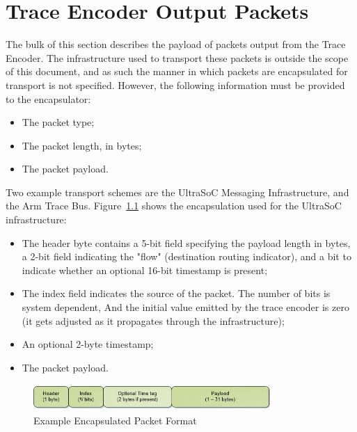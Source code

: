 \chapter{Trace Encoder Output Packets} \label{packets}

The bulk of this section describes the payload of packets output from the Trace Encoder.  
The infrastructure used to transport these packets is outside the scope of this document, and
as such the manner in which packets are encapsulated for transport is not specified.
However, the following information must be provided to the encapsulator:

\begin{itemize}
  \item The packet type;
  \item The packet length, in bytes;
  \item The packet payload.
\end{itemize}

Two example transport schemes are the UltraSoC Messaging Infrastructure, and the Arm Trace Bus.
Figure~\ref{fig:packet-format} shows the encapsulation used for the UltraSoC infrastructure:
\begin{itemize}
  \item The header byte contains a 5-bit field specifying the payload length in bytes, a 2-bit
    field indicating the "flow" (destination routing indicator), and a bit to indicate whether
    an optional 16-bit timestamp is present;
  \item The index field indicates the source of the packet.  The number of bits is system dependent,
    And the initial value emitted by the trace encoder is zero (it gets adjusted as it propagates 
    through the infrastructure);
  \item An optional 2-byte timestamp;
  \item The packet payload.
\end{itemize}

\begin{figure}[h]
  \begin{center}
    \includegraphics[height=1cm, width=9cm]{newPacket.jpg}
    \caption{Example Encapsulated Packet Format}
    \label{fig:packet-format}
  \end{center}
\end{figure}


